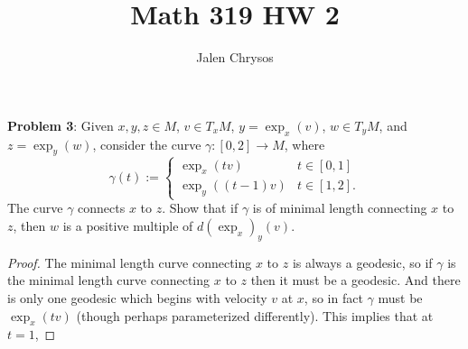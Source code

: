 \documentclass{amsart}
\title{Math 319 HW 2}
\author{Jalen Chrysos}
\begin{document}
	\maketitle 
	
	\textbf{Problem 3}: Given $x,y,z\in M$, $v\in T_xM$, $y=\exp_x(v)$, $w\in T_yM$, and $z=\exp_y(w)$, consider the curve $\gamma:[0,2]\to M$, where
	$$
	\gamma(t) := \begin{cases}
		\exp_x(tv) & t\in [0,1]\\
		\exp_y((t-1)v) & t\in [1,2].
	\end{cases}
	$$
	The curve $\gamma$ connects $x$ to $z$. Show that if $\gamma$ is of minimal length connecting $x$ to $z$, then $w$ is a positive multiple of $d(\exp_x)_y(v)$.
	\begin{proof}
		The minimal length curve connecting $x$ to $z$ is always a geodesic, so if $\gamma$ is the minimal length curve connecting $x$ to $z$ then it must be a geodesic. And there is only one geodesic which begins with velocity $v$ at $x$, so in fact $\gamma$ must be $\exp_x(tv)$ (though perhaps parameterized differently). This implies that at $t=1$, 
	\end{proof}
	
	
	\newpage
	
\end{document}
